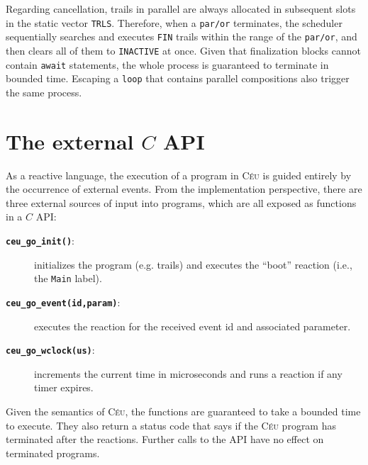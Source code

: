 \documentclass{sigplanconf}
\newcommand{\CEU}{\textsc{C\'{e}u}\xspace}
\newcommand{\code}[1] {{\small{\texttt{#1}}}}
\newcommand{\1}{\;}
\newcommand{\2}{\;\;}
\newcommand{\3}{\;\;\;}
\newcommand{\5}{\;\;\;\;\;}
\begin{document}
Regarding cancellation, trails in parallel are always allocated in subsequent 
slots in the static vector \code{TRLS}.
Therefore, when a \code{par/or} terminates, the scheduler sequentially searches 
and executes \code{FIN} trails within the range of the \code{par/or}, and then 
clears all of them to \code{INACTIVE} at once.
Given that finalization blocks cannot contain \code{await} statements, the 
whole process is guaranteed to terminate in bounded time.
Escaping a \code{loop} that contains parallel compositions also trigger the 
same process.

\section{The external $C$ API}

As a reactive language, the execution of a program in \CEU is guided entirely 
by the occurrence of external events.
From the implementation perspective, there are three external sources of input 
into programs, which are all exposed as functions in a $C$ API:

\begin{description}
\item[{\textbf\code{ceu\_go\_init()}}:] initializes the program (e.g. trails) 
and executes the ``boot'' reaction (i.e., the \code{Main} label).

\item[{\textbf\code{ceu\_go\_event(id,param)}}:] executes the reaction for the 
received event id and associated parameter.

\item[{\textbf\code{ceu\_go\_wclock(us)}}:] increments the current time in 
microseconds and runs a reaction if any timer expires.

\end{description}

Given the semantics of \CEU, the functions are guaranteed to take a bounded 
time to execute.
They also return a status code that says if the \CEU{} program has terminated 
after the reactions.
Further calls to the API have no effect on terminated programs.

\end{document}
